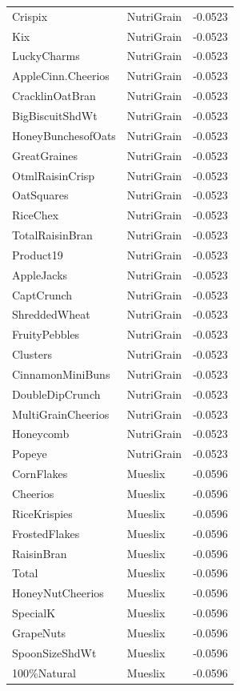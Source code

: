 \begin{table}[!htbp]
\begin{tabular}{lll}
Crispix & NutriGrain & -0.0523
\\
Kix & NutriGrain & -0.0523
\\
LuckyCharms & NutriGrain & -0.0523
\\
AppleCinn.Cheerios & NutriGrain & -0.0523
\\
CracklinOatBran & NutriGrain & -0.0523
\\
BigBiscuitShdWt & NutriGrain & -0.0523
\\
HoneyBunchesofOats & NutriGrain & -0.0523
\\
GreatGraines & NutriGrain & -0.0523
\\
OtmlRaisinCrisp & NutriGrain & -0.0523
\\
OatSquares & NutriGrain & -0.0523
\\
RiceChex & NutriGrain & -0.0523
\\
TotalRaisinBran & NutriGrain & -0.0523
\\
Product19 & NutriGrain & -0.0523
\\
AppleJacks & NutriGrain & -0.0523
\\
CaptCrunch & NutriGrain & -0.0523
\\
ShreddedWheat & NutriGrain & -0.0523
\\
FruityPebbles & NutriGrain & -0.0523
\\
Clusters & NutriGrain & -0.0523
\\
CinnamonMiniBuns & NutriGrain & -0.0523
\\
DoubleDipCrunch & NutriGrain & -0.0523
\\
MultiGrainCheerios & NutriGrain & -0.0523
\\
Honeycomb & NutriGrain & -0.0523
\\
Popeye & NutriGrain & -0.0523
\\
CornFlakes & Mueslix & -0.0596
\\
Cheerios & Mueslix & -0.0596
\\
RiceKrispies & Mueslix & -0.0596
\\
FrostedFlakes & Mueslix & -0.0596
\\
RaisinBran & Mueslix & -0.0596
\\
Total & Mueslix & -0.0596
\\
HoneyNutCheerios & Mueslix & -0.0596
\\
SpecialK & Mueslix & -0.0596
\\
GrapeNuts & Mueslix & -0.0596
\\
SpoonSizeShdWt & Mueslix & -0.0596
\\
100\%Natural & Mueslix & -0.0596
\\

\end{tabular}
\end{table}
